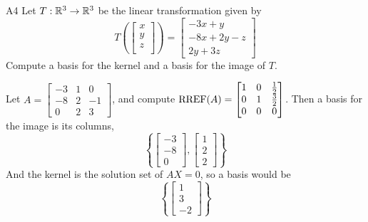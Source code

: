 \begin{problem}{A4}
Let $T: \mathbb{R}^3\rightarrow \mathbb{R}^3$ be the linear transformation given by $$T\left(\begin{bmatrix} x \\ y \\ z \\  \end{bmatrix} \right) = \begin{bmatrix} -3x+y \\ -8x+2y-z \\ 2y+3z \end{bmatrix}$$
Compute a basis for the kernel and a basis for the image of $T$.
\end{problem}
\begin{solution}
Let $A= \begin{bmatrix}-3 & 1 & 0 \\ -8 & 2 & -1 \\ 0 & 2 & 3\end{bmatrix}$, and compute $\operatorname{RREF}(A) = \begin{bmatrix} 1 & 0 & \frac{1}{2} \\ 0 & 1 & \frac{3}{2} \\ 0 & 0 & 0 \end{bmatrix}$.  Then a basis for the image is its columns, $$\left\{ \begin{bmatrix} -3 \\ -8 \\ 0 \end{bmatrix}, \begin{bmatrix} 1 \\ 2 \\ 2 \end{bmatrix} \right\}$$
And the kernel is the solution set of $AX=0$, so a basis would be
$$\left\{\begin{bmatrix} 1 \\ 3 \\ -2 \end{bmatrix} \right\}$$
\end{solution}


